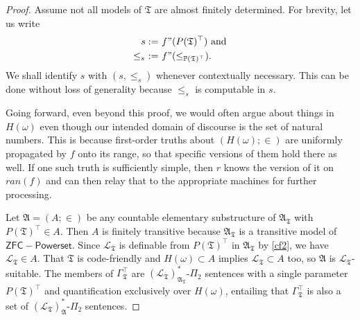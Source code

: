 \documentclass[12pt, twoside]{memoir}
\numberwithin{equation}{section}
\theoremstyle{definition}
\theoremstyle{remark}
\theoremstyle{definition}
\theoremstyle{definition}
\theoremstyle{definition}
\theoremstyle{remark}
\begin{document}
\begin{proof}
Assume not all models of $\mathfrak{T}$ are almost finitely determined. For brevity, let us write
\begin{align*}
    s := \ & f" (P(\mathfrak{T})^{\top}) \text{ and} \\
    \leq_s \ := \ & f" (\leq_{\mathbb{P}(\mathfrak{T})^{\top}}) \text{.}
\end{align*} 
We shall identify $s$ with $(s, \leq_s)$ whenever contextually necessary. This can be done without loss of generality because $\leq_s$ is computable in $s$.

Going forward, even beyond this proof, we would often argue about things in $H(\omega)$ even though our intended domain of discourse is the set of natural numbers. This is because first-order truths about $(H(\omega); \in)$ are uniformly propagated by $f$ onto its range, so that specific versions of them hold there as well. If one such truth is sufficiently simple, then $r$ knows the version of it on $ran(f)$ and can then relay that to the appropriate machines for further processing. 

Let $\mathfrak{A} = (A; \in)$ be any countable elementary substructure of $\mathfrak{A}_{\mathfrak{T}}$ with $P(\mathfrak{T})^{\top} \in A$. Then $A$ is finitely transitive because $\mathfrak{A}_{\mathfrak{T}}$ is a transitive model of $\mathsf{ZFC - Powerset}$. Since $\mathcal{L}_{\mathfrak{T}}$ is definable from $P(\mathfrak{T})^{\top}$ in $\mathfrak{A}_{\mathfrak{T}}$ by \ref{cf2}, we have $\mathcal{L}_{\mathfrak{T}} \in A$. That $\mathfrak{T}$ is code-friendly and $H(\omega) \subset A$ implies $\mathcal{L}_{\mathfrak{T}} \subset A$ too, so $\mathfrak{A}$ is $\mathcal{L}_{\mathfrak{T}}$-suitable. The members of $\Gamma_{\mathfrak{T}}^{\top}$ are $(\mathcal{L}_{\mathfrak{T}})^*_{\mathfrak{A}_{\mathfrak{T}}}$-$\Pi_2$ sentences with a single parameter $P(\mathfrak{T})^{\top}$ and quantification exclusively over $H(\omega)$, entailing that $\Gamma_{\mathfrak{T}}^{\top}$ is also a set of $(\mathcal{L}_{\mathfrak{T}})^*_{\mathfrak{A}}$-$\Pi_2$ sentences. 


\end{proof}
\end{document}
